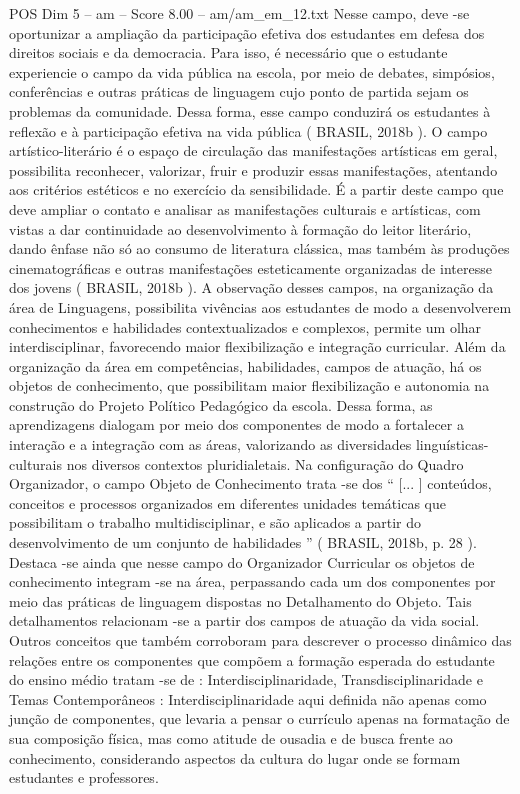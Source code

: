 \begin{textsample}{POS Dim 5 – am – Score 8.00 – am/am\_em\_12.txt}
Nesse campo, deve -se oportunizar a ampliação da participação efetiva dos estudantes em defesa dos direitos sociais e da democracia.
Para isso, é necessário que o estudante experiencie o campo da vida pública na escola, por meio de debates, simpósios, conferências e outras práticas de linguagem cujo ponto de partida sejam os problemas da comunidade.
Dessa forma, esse campo conduzirá os estudantes à reflexão e à participação efetiva na vida pública ( BRASIL, 2018b ).
O campo artístico-literário é o espaço de circulação das manifestações artísticas em geral, possibilita reconhecer, valorizar, fruir e produzir essas manifestações, atentando aos critérios estéticos e no exercício da sensibilidade.
É a partir deste campo que deve ampliar o contato e analisar as manifestações culturais e artísticas, com vistas a dar continuidade ao desenvolvimento à formação do leitor literário, dando ênfase não só ao consumo de literatura clássica, mas também às produções cinematográficas e outras manifestações esteticamente organizadas de interesse dos jovens ( BRASIL, 2018b ).
A observação desses campos, na organização da área de Linguagens, possibilita vivências aos estudantes de modo a desenvolverem conhecimentos e habilidades contextualizados e complexos, permite um olhar interdisciplinar, favorecendo maior flexibilização e integração curricular.
Além da organização da área em competências, habilidades, campos de atuação, há os objetos de conhecimento, que possibilitam maior flexibilização e autonomia na construção do Projeto Político Pedagógico da escola.
Dessa forma, as aprendizagens dialogam por meio dos componentes de modo a fortalecer a interação e a integração com as áreas, valorizando as diversidades linguísticas-culturais nos diversos contextos pluridialetais.
Na configuração do Quadro Organizador, o campo Objeto de Conhecimento trata -se dos “ [... ] conteúdos, conceitos e processos organizados em diferentes unidades temáticas que possibilitam o trabalho multidisciplinar, e são aplicados a partir do desenvolvimento de um conjunto de habilidades ” ( BRASIL, 2018b, p. 28 ).
Destaca -se ainda que nesse campo do Organizador Curricular os objetos de conhecimento integram -se na área, perpassando cada um dos componentes por meio das práticas de linguagem dispostas no Detalhamento do Objeto.
Tais detalhamentos relacionam -se a partir dos campos de atuação da vida social.
Outros conceitos que também corroboram para descrever o processo dinâmico das relações entre os componentes que compõem a formação esperada do estudante do ensino médio tratam -se de : Interdisciplinaridade, Transdisciplinaridade e Temas Contemporâneos : Interdisciplinaridade aqui definida não apenas como junção de componentes, que levaria a pensar o currículo apenas na formatação de sua composição física, mas como atitude de ousadia e de busca frente ao conhecimento, considerando aspectos da cultura do lugar onde se formam estudantes e professores.

\end{textsample}
